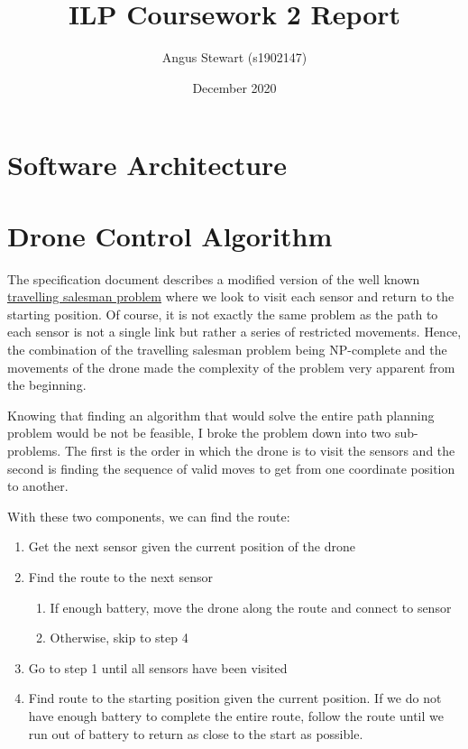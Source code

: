 \documentclass[11pt]{article}
\title{ILP Coursework 2 Report}
\author{Angus Stewart (s1902147)}
\date{December 2020}
\begin{document}
\maketitle

\tableofcontents

\newpage

\section{Software Architecture}

\newpage

\section{Drone Control Algorithm}
The specification document describes a modified version of the well known \href{https://en.wikipedia.org/wiki/Travelling\_salesman\_problem}{travelling salesman problem} where we look to visit each sensor and return to the starting position. Of course, it is not exactly the same problem as the path to each sensor is not a single link but rather a series of restricted movements. Hence, the combination of the travelling salesman problem being NP-complete and the movements of the drone made the complexity of the problem very apparent from the beginning.

Knowing that finding an algorithm that would solve the entire path planning problem would be not be feasible, I broke the problem down into two sub-problems. The first is the order in which the drone is to visit the sensors and the second is finding the sequence of valid moves to get from one coordinate position to another.

With these two components, we can find the route:
\begin{enumerate}[topsep=0pt, itemsep=0pt]
    \item Get the next sensor given the current position of the drone
    \item Find the route to the next sensor
    \begin{enumerate}[topsep=0pt, itemsep=0pt]
        \item If enough battery, move the drone along the route and connect to sensor
        \item Otherwise, skip to step 4
    \end{enumerate}
    \item Go to step 1 until all sensors have been visited
    \item Find route to the starting position given the current position. If we do not have enough battery to complete the entire route, follow the route until we run out of battery to return as close to the start as possible.
\end{enumerate}
\end{document}
